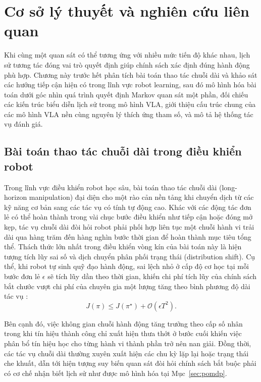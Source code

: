 \chapter{Cơ sở lý thuyết và nghiên cứu liên quan}

Khi cùng một quan sát có thể tương ứng với nhiều mức tiến độ khác nhau, lịch sử tương tác đóng vai trò quyết định giúp chính sách xác định đúng hành động phù hợp. Chương này trước hết phân tích bài toán thao tác chuỗi dài và khảo sát các hướng tiếp cận hiện có trong lĩnh vực robot learning, sau đó mô hình hóa bài toán dưới góc nhìn quá trình quyết định Markov quan sát một phần, đối chiếu các kiến trúc biểu diễn lịch sử trong mô hình VLA, giới thiệu cấu trúc chung của các mô hình VLA nền cùng nguyên lý thích ứng tham số, và mô tả hệ thống tác vụ đánh giá.

\section{Bài toán thao tác chuỗi dài trong điều khiển robot}

Trong lĩnh vực điều khiển robot học sâu, bài toán thao tác chuỗi dài (long-horizon manipulation) đại diện cho một rào cản nền tảng khi chuyển dịch từ các kỹ năng cơ bản sang các tác vụ có tính tự động cao. Khác với các động tác đơn lẻ có thể hoàn thành trong vài chục bước điều khiển như tiếp cận hoặc đóng mở kẹp, tác vụ chuỗi dài đòi hỏi robot phải phối hợp liên tục một chuỗi hành vi trải dài qua hàng trăm đến hàng nghìn bước thời gian để hoàn thành mục tiêu tổng thể. Thách thức lớn nhất trong điều khiển vòng kín của bài toán này là hiện tượng tích lũy sai số và dịch chuyển phân phối trạng thái (distribution shift). Cụ thể, khi robot tự sinh quỹ đạo hành động, sai lệch nhỏ ở cấp độ cơ học tại mỗi bước đơn lẻ $\epsilon$ sẽ tích lũy dần theo thời gian, khiến chi phí tích lũy của chính sách bắt chước vượt chi phí của chuyên gia một lượng tăng theo bình phương độ dài tác vụ \cite{ross2010dagger}:
\begin{equation}
J(\pi) \le J(\pi^\star) + \mathcal{O}(\epsilon T^2).
\label{eq:compounding-error}
\end{equation}

Bên cạnh đó, việc không gian chuỗi hành động tăng trưởng theo cấp số nhân trong khi tín hiệu thành công chỉ xuất hiện thưa thớt ở bước cuối khiến việc phân bổ tín hiệu học cho từng hành vi thành phần trở nên nan giải. Đồng thời, các tác vụ chuỗi dài thường xuyên xuất hiện các chu kỳ lặp lại hoặc trạng thái che khuất, dẫn tới hiện tượng suy biến quan sát đòi hỏi chính sách bắt buộc phải có cơ chế nhận biết lịch sử như được mô hình hóa tại Mục~\ref{sec:pomdp}.

